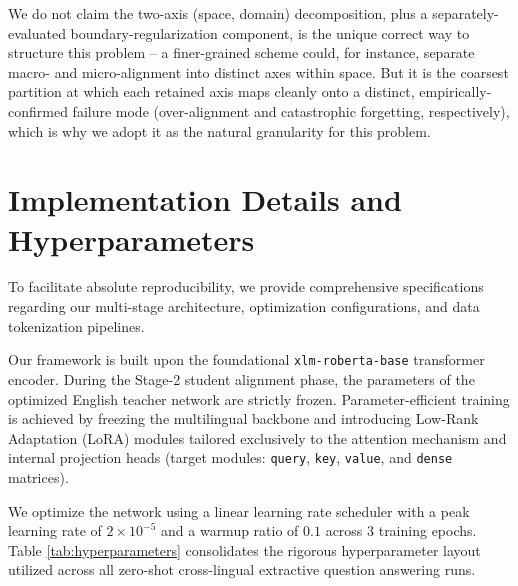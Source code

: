 \documentclass[11pt]{article}
\begin{document}
We do not claim the two-axis (space, domain) decomposition, plus a separately-evaluated boundary-regularization component, is the unique correct way to structure this problem -- a finer-grained scheme could, for instance, separate macro- and micro-alignment into distinct axes within space. But it is the coarsest partition at which each retained axis maps cleanly onto a distinct, empirically-confirmed failure mode (over-alignment and catastrophic forgetting, respectively), which is why we adopt it as the natural granularity for this problem.

\section{Implementation Details and Hyperparameters}
\label{sec:appendix_implementation}
To facilitate absolute reproducibility, we provide comprehensive specifications regarding our multi-stage architecture, optimization configurations, and data tokenization pipelines. 

Our framework is built upon the foundational \texttt{xlm-roberta-base} transformer encoder. During the Stage-2 student alignment phase, the parameters of the optimized English teacher network are strictly frozen. Parameter-efficient training is achieved by freezing the multilingual backbone and introducing Low-Rank Adaptation (LoRA) modules tailored exclusively to the attention mechanism and internal projection heads (target modules: \texttt{query}, \texttt{key}, \texttt{value}, and \texttt{dense} matrices). 

We optimize the network using a linear learning rate scheduler with a peak learning rate of $2\times 10^{-5}$ and a warmup ratio of $0.1$ across 3 training epochs. Table \ref{tab:hyperparameters} consolidates the rigorous hyperparameter layout utilized across all zero-shot cross-lingual extractive question answering runs.
\end{document}

